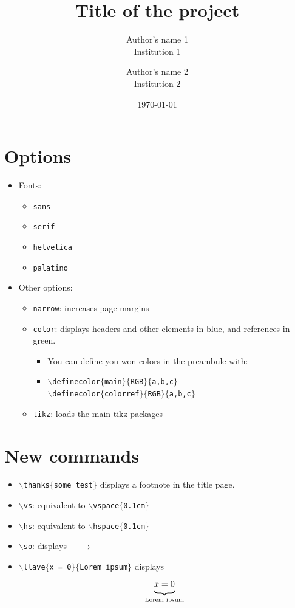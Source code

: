 \documentclass[12pt]{../bppaper}
\title{Title of the project}
\author{Author's name 1\\Institution 1 \and Author's name 2\\Institution 2}
\date{\today}
\begin{document}
\maketitle 


\section{Options}

\begin{itemize}
    \item Fonts:
    \begin{itemize}
        \item \texttt{sans}
        \item \texttt{serif}
        \item \texttt{helvetica}
        \item \texttt{palatino}
    \end{itemize}
    \item Other options:
    \begin{itemize}
        \item \texttt{narrow}: increases page margins
        \item \texttt{color}: displays headers and other elements in blue, and references in green.
        \begin{itemize}
            \item You can define you won colors in the preambule with:
            \item[] \texttt{$\backslash$definecolor$\{$main$\}\{$RGB$\}\{$a,b,c$\}$}\\
            \texttt{$\backslash$definecolor$\{$colorref$\}\{$RGB$\}\{$a,b,c$\}$} 
        \end{itemize}
        \item \texttt{tikz}: loads the main tikz packages
    \end{itemize}
\end{itemize}

\section{New commands}

\begin{itemize}
    \item \texttt{$\backslash$thanks$\{$some test$\}$} displays a footnote in the title page.
    \item \texttt{$\backslash$vs}: equivalent to \texttt{$\backslash$vspace$\{$0.1cm$\}$}
    \item \texttt{$\backslash$hs}: equivalent to \texttt{$\backslash$hspace$\{$0.1cm$\}$}
    \item \texttt{$\backslash$so}: displays $\so$
    \item \texttt{$\backslash$llave$\{$x = 0$\}$$\{$Lorem ipsum$\}$} displays $$\llave{x=0}{Lorem ipsum}$$
\end{itemize}
\end{document}
